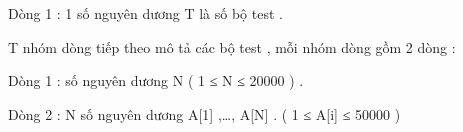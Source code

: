 Dòng 1 : 1 số nguyên dương T là số bộ test .   


   T nhóm dòng tiếp theo mô tả các bộ test , mỗi nhóm dòng gồm 2 dòng :   


   Dòng 1 : số nguyên dương N  ( 1 ≤ N ≤ 20000 )  .   


   Dòng 2 : N số nguyên dương A[1] ,…, A[N] . ( 1 ≤ A[i] ≤ 50000 )